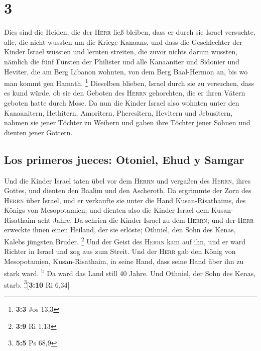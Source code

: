 \hypertarget{section-2}{%
\section{3}\label{section-2}}

 Dies sind die Heiden, die der \textsc{Herr} ließ bleiben,
dass er durch sie Israel versuchte, alle, die nicht wussten um die
Kriege Kanaans,  und dass die Geschlechter der Kinder
Israel wüssten und lernten streiten, die zuvor nichts darum wussten,
 nämlich die fünf Fürsten der Philister und alle
Kanaaniter und Sidonier und Heviter, die am Berg Libanon wohnten, von
dem Berg Baal-Hermon an, bis wo man kommt gen Hamath. \footnote{\textbf{3:3}
  Jos 13,3}  Dieselben blieben, Israel durch sie zu
versuchen, dass es kund würde, ob sie den Geboten des \textsc{Herrn}
gehorchten, die er ihren Vätern geboten hatte durch Mose. 
Da nun die Kinder Israel also wohnten unter den Kanaanitern, Hethitern,
Amoritern, Pheresitern, Hevitern und Jebusitern,  nahmen
sie jener Töchter zu Weibern und gaben ihre Töchter jener Söhnen und
dienten jener Göttern.

\hypertarget{los-primeros-jueces-otoniel-ehud-y-samgar}{%
\subsection{Los primeros jueces: Otoniel, Ehud y
Samgar}\label{los-primeros-jueces-otoniel-ehud-y-samgar}}

 Und die Kinder Israel taten übel vor dem \textsc{Herrn}
und vergaßen des \textsc{Herrn}, ihres Gottes, und dienten den Baalim
und den Ascheroth.  Da ergrimmte der Zorn des
\textsc{Herrn} über Israel, und er verkaufte sie unter die Hand
Kusan-Risathaims, des Königs von Mesopotamien; und dienten also die
Kinder Israel dem Kusan-Risathaim acht Jahre.  Da schrien
die Kinder Israel zu dem \textsc{Herrn}; und der \textsc{Herr} erweckte
ihnen einen Heiland, der sie erlöste; Othniel, den Sohn des Kenas,
Kalebs jüngsten Bruder. \footnote{\textbf{3:9} Ri 1,13} 
Und der Geist des \textsc{Herrn} kam auf ihn, und er ward Richter in
Israel und zog aus zum Streit. Und der \textsc{Herr} gab den König von
Mesopotamien, Kusan-Risathaim, in seine Hand, dass seine Hand über ihn
zu stark ward. \textsuperscript{b}  Da ward das Land
still 40 Jahre. Und Othniel, der Sohn des Kenas, starb.
\footnote{\textbf{5:5} Ps 68,9}{[}\textbf{3:10} Ri 6,34{]}

